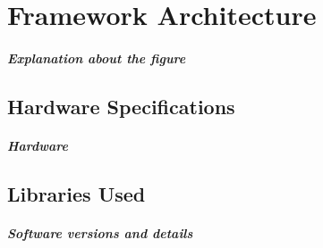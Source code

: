 \chapter{Framework Architecture}
\paragraph{Explanation about the figure}

\section{Hardware Specifications}
\paragraph{Hardware}

\section{Libraries Used}
\paragraph{Software versions and details}

